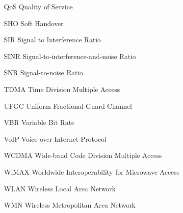 \begin{denotation}
  \item[QoS] Quality of Service
  \item[SHO] Soft Handover
  \item[SIR] Signal to Interference Ratio
  \item[SINR]Signal-to-interference-and-noise Ratio
  \item[SNR] Signal-to-noise Ratio
  \item[TDMA]Time Division Multiple Access
  \item[UFGC] Uniform Fractional Guard Channel
  \item[VBR] Variable Bit Rate
  \item[VoIP] Voice over Internet Protocol 
  \item[WCDMA] Wide-band Code Division Multiple Access
  \item[WiMAX] Worldwide Interoperability for Microwave Access
  \item[WLAN] Wireless Local Area Network
  \item[WMN] Wireless Metropolitan Area Network
\end{denotation}
